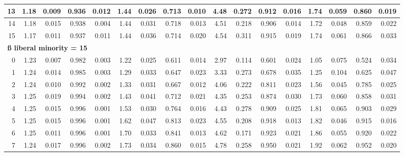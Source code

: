 \documentclass[
]{article}
\begin{document}
\begin{table}[H]
{\begin{tabular}[t]{r|r|r|r|r|r|r|r|r|r|r|r|r|r|r|r|r}
\hline
\hspace{1em}13 & 1.18 & 0.009 & 0.936 & 0.012 & 1.44 & 0.026 & 0.713 & 0.010 & 4.48 & 0.272 & 0.912 & 0.016 & 1.74 & 0.059 & 0.860 & 0.019\\
\hline
\hspace{1em}14 & 1.18 & 0.015 & 0.938 & 0.004 & 1.44 & 0.031 & 0.718 & 0.013 & 4.51 & 0.218 & 0.906 & 0.014 & 1.72 & 0.048 & 0.859 & 0.022\\
\hline
\hspace{1em}15 & 1.17 & 0.011 & 0.937 & 0.011 & 1.44 & 0.036 & 0.714 & 0.020 & 4.54 & 0.311 & 0.915 & 0.019 & 1.74 & 0.061 & 0.866 & 0.033\\
\hline
\multicolumn{17}{l}{\textbf{ß liberal minority = 15}}\\
\hline
\hspace{1em}0 & 1.23 & 0.007 & 0.982 & 0.003 & 1.22 & 0.025 & 0.611 & 0.014 & 2.97 & 0.114 & 0.601 & 0.024 & 1.05 & 0.075 & 0.524 & 0.034\\
\hline
\hspace{1em}1 & 1.24 & 0.014 & 0.985 & 0.003 & 1.29 & 0.033 & 0.647 & 0.023 & 3.33 & 0.273 & 0.678 & 0.035 & 1.25 & 0.104 & 0.625 & 0.047\\
\hline
\hspace{1em}2 & 1.24 & 0.010 & 0.992 & 0.002 & 1.33 & 0.031 & 0.667 & 0.012 & 4.06 & 0.222 & 0.811 & 0.023 & 1.56 & 0.045 & 0.785 & 0.025\\
\hline
\hspace{1em}3 & 1.25 & 0.019 & 0.994 & 0.002 & 1.43 & 0.041 & 0.712 & 0.021 & 4.35 & 0.253 & 0.874 & 0.030 & 1.73 & 0.060 & 0.858 & 0.031\\
\hline
\hspace{1em}4 & 1.25 & 0.015 & 0.996 & 0.001 & 1.53 & 0.030 & 0.764 & 0.016 & 4.43 & 0.278 & 0.909 & 0.025 & 1.81 & 0.065 & 0.903 & 0.029\\
\hline
\hspace{1em}5 & 1.25 & 0.015 & 0.996 & 0.001 & 1.62 & 0.047 & 0.813 & 0.023 & 4.55 & 0.208 & 0.918 & 0.013 & 1.82 & 0.046 & 0.915 & 0.016\\
\hline
\hspace{1em}6 & 1.25 & 0.011 & 0.996 & 0.001 & 1.70 & 0.033 & 0.841 & 0.013 & 4.62 & 0.171 & 0.923 & 0.021 & 1.86 & 0.055 & 0.920 & 0.022\\
\hline
\hspace{1em}7 & 1.24 & 0.017 & 0.996 & 0.002 & 1.73 & 0.034 & 0.860 & 0.015 & 4.78 & 0.258 & 0.950 & 0.021 & 1.92 & 0.062 & 0.952 & 0.020\\

\end{tabular}}
\end{table}
\end{document}
